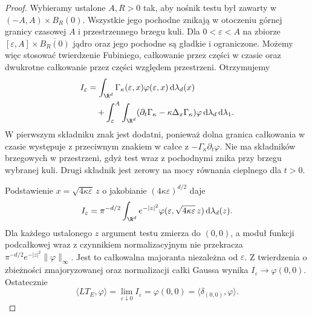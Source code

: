 \begin{proof}
Wybieramy ustalone $A,R>0$ tak, aby
nośnik testu był zawarty w
$(-A,A)\times B_R(0)$. Wszystkie jego pochodne
znikają w otoczeniu górnej granicy czasowej $A$
i przestrzennego brzegu kuli.
Dla $0<\varepsilon<A$ na zbiorze
$[\varepsilon,A]\times\overline{B_R(0)}$
jądro oraz jego pochodne są gładkie i ograniczone.
Możemy więc stosować twierdzenie Fubiniego,
całkowanie przez części w czasie oraz dwukrotne
całkowanie przez części względem przestrzeni.
Otrzymujemy
\[
\begin{aligned}
 I_\varepsilon
 &=\int_{\R^d}\Gamma_\kappa(\varepsilon,x)
           \varphi(\varepsilon,x)\,\mathrm d\lambda_d(x)\\
 &\quad+\int_\varepsilon^A\int_{\R^d}
  (\partial_t\Gamma_\kappa-\kappa\Delta_x\Gamma_\kappa)
       \varphi\,\mathrm d\lambda_d\,\mathrm d\lambda_1.
\end{aligned}
\]
W pierwszym składniku znak jest dodatni,
ponieważ dolna granica całkowania w czasie
występuje z przeciwnym znakiem w całce
z $-\Gamma_\kappa\partial_t\varphi$.
Nie ma składników brzegowych w przestrzeni,
gdyż test wraz z pochodnymi znika przy
brzegu wybranej kuli. Drugi składnik jest
zerowy na mocy równania cieplnego dla $t>0$.

Podstawienie $x=\sqrt{4\kappa\varepsilon}\,z$
o jakobianie $(4\kappa\varepsilon)^{d/2}$ daje
\[
 I_\varepsilon
 =\pi^{-d/2}\int_{\R^d}e^{-|z|^2}
 \varphi(\varepsilon,\sqrt{4\kappa\varepsilon}\,z)
 \,\mathrm d\lambda_d(z).
\]
Dla każdego ustalonego $z$ argument testu zmierza
do $(0,0)$, a moduł funkcji podcałkowej wraz
z czynnikiem normalizacyjnym nie przekracza
$\pi^{-d/2}e^{-|z|^2}\|\varphi\|_\infty$.
Jest to całkowalna majoranta niezależna od
$\varepsilon$. Z twierdzenia o zbieżności
zmajoryzowanej oraz normalizacji całki Gaussa
wynika $I_\varepsilon\to\varphi(0,0)$.
Ostatecznie
\[
 \langle LT_E,\varphi\rangle
 =\lim_{\varepsilon\downarrow0} I_\varepsilon
 =\varphi(0,0)
 =\langle\delta_{(0,0)},\varphi\rangle.
\]
\end{proof}


